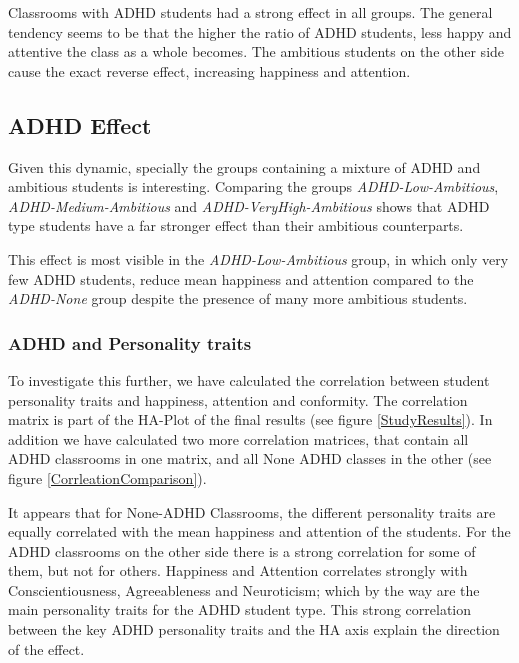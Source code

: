 Classrooms with ADHD students had a strong effect in all groups. The general
tendency seems to be that the higher the ratio of ADHD students, less happy and
attentive the class as a whole becomes. The ambitious students on the other
side cause the exact reverse effect, increasing happiness and attention.

\subsection{ADHD Effect}
Given this dynamic, specially the groups containing a mixture of ADHD and
ambitious students is interesting. Comparing the groups \textit{ADHD-Low-Ambitious},
\textit{ADHD-Medium-Ambitious} and \textit{ADHD-VeryHigh-Ambitious} shows that ADHD
type students have a far stronger effect than their ambitious counterparts.

\bb

This effect is most visible in the \textit{ADHD-Low-Ambitious} group, in which only
very few ADHD students, reduce mean happiness and attention compared to the \textit{ADHD-None}
group despite the presence of many more ambitious students.

\bb

\subsubsection{ADHD and Personality traits}
To investigate this further, we have calculated the correlation between student personality
traits and happiness, attention and conformity. The correlation matrix is part
of the HA-Plot of the final results (see figure \ref{StudyResults}). In addition we have calculated
two more correlation matrices, that contain all ADHD classrooms in one matrix, and
all None ADHD classes in the other (see figure \ref{CorrleationComparison}).

\bb

It appears that for None-ADHD Classrooms, the different personality traits are equally
correlated with the mean happiness and attention of the students. For the ADHD
classrooms on the other side there is a strong correlation for some of them, but not
for others. Happiness and Attention correlates strongly with Conscientiousness, Agreeableness
and Neuroticism; which by the way are the main personality traits for the ADHD student
type. This strong correlation between the key ADHD personality traits and the HA
axis explain the direction of the effect.

\bb

